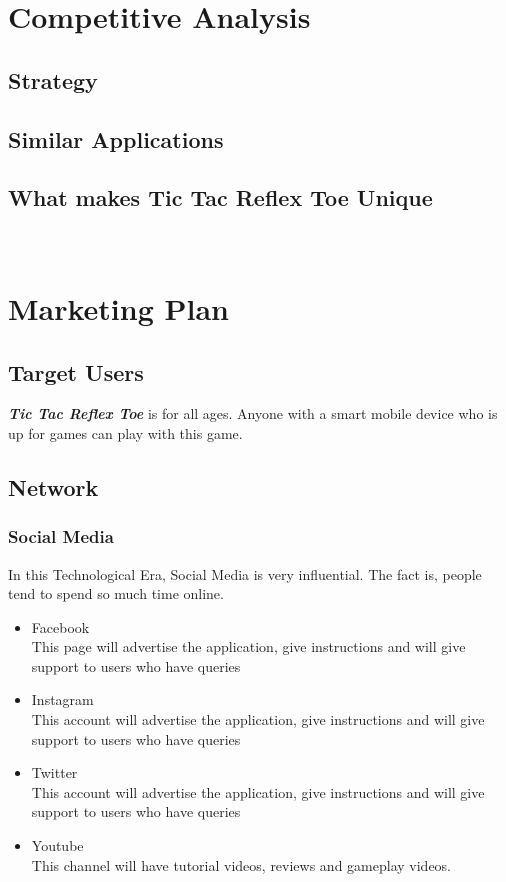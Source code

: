 \documentclass{scrartcl}
\begin{document}
\section{Competitive Analysis}
\subsection{Strategy}
\subsection{Similar Applications}
\subsection{What makes Tic Tac Reflex Toe Unique}

~\newline
\section{Marketing Plan}
\subsection{Target Users}
    \textbf{\emph{Tic Tac Reflex Toe}} is for all ages.  Anyone with a smart mobile device who is up for games can play with this game.
\subsection{Network}
    \subsubsection{Social Media}
        In this Technological Era, Social Media is very influential.  The fact is, people tend to spend so much time online.  
        \newline
        \begin{itemize}
        	\item Facebook\\This page will advertise the application, give instructions and will give support to users who have queries
        	\item Instagram\\This account will advertise the application, give instructions and will give support to users who have queries
        	\item Twitter\\This account will advertise the application, give instructions and will give support to users who have queries
        	\item Youtube\\This channel will have tutorial videos, reviews and gameplay videos.
        \end{itemize}
    
\end{document}

